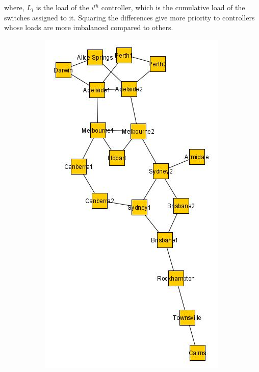 \documentclass[preprint,12pt]{elsarticle}
\begin{document}
	where, $L_i$ is the load of the $i^{th}$ controller, which is the cumulative load of the switches assigned to it. Squaring the differences give more priority to controllers whose loads are more imbalanced compared to others.
	
	\begin{figure}
		\centering
		\begin{subfigure}{0.3\textwidth}
			\includegraphics[width=\linewidth]{Images/Aarnet_Graph.jpg}

\end{subfigure}
\end{figure}
\end{document}
